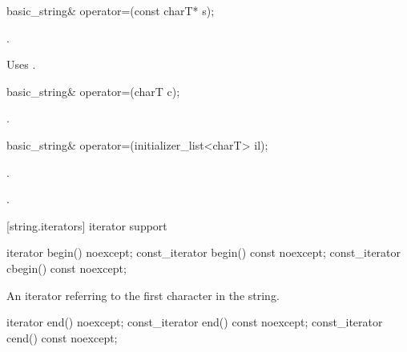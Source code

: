 %
%
\begin{itemdecl}
basic_string& operator=(const charT* s);
\end{itemdecl}

\begin{itemdescr}
\pnum
\returns
{}.

\pnum
\notes
Uses
%
.
\end{itemdescr}

%
%
\begin{itemdecl}
basic_string& operator=(charT c);
\end{itemdecl}

\begin{itemdescr}
\pnum
\returns
{}.
\end{itemdescr}

%
%
\begin{itemdecl}
basic_string& operator=(initializer_list<charT> il);
\end{itemdecl}

\begin{itemdescr}
\pnum
\effects {}.

\pnum
\returns {}.
\end{itemdescr}

[string.iterators]{ iterator support}

%
%
%
%
\begin{itemdecl}
iterator       begin() noexcept;
const_iterator begin() const noexcept;
const_iterator cbegin() const noexcept;
\end{itemdecl}

\begin{itemdescr}
\pnum
\returns
An iterator referring to the first character in the string.
\end{itemdescr}

%
%
%
%
\begin{itemdecl}
iterator       end() noexcept;
const_iterator end() const noexcept;
const_iterator cend() const noexcept;
\end{itemdecl}

